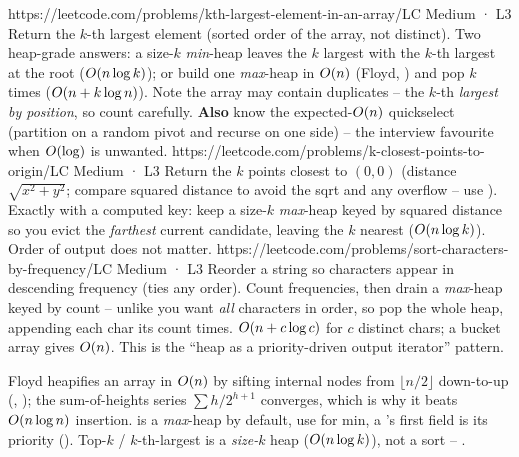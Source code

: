 \begin{practiceset}
    {https://leetcode.com/problems/kth-largest-element-in-an-array/}{LC Medium · L3}
    {Return the $k$-th largest element (sorted order of the array, not distinct). Two heap-grade answers:
    a size-$k$ \emph{min}-heap leaves the $k$ largest with the $k$-th largest at the root ($O(n\log k)$);
    or build one \emph{max}-heap in $O(n)$ (Floyd, ) and pop $k$ times
    ($O(n + k\log n)$). Note the array may contain duplicates -- the $k$-th \emph{largest by position},
    so count carefully. \textbf{Also} know the expected-$O(n)$ quickselect (partition on a random pivot
    and recurse on one side) -- the interview favourite when $O(\log) $ is unwanted.}
    {https://leetcode.com/problems/k-closest-points-to-origin/}{LC Medium · L3}
    {Return the $k$ points closest to $(0,0)$ (distance $\sqrt{x^2+y^2}$; compare squared distance to avoid
    the sqrt and any overflow -- use ). Exactly  with a computed key: keep
    a size-$k$ \emph{max}-heap keyed by squared distance so you evict the \emph{farthest} current candidate,
    leaving the $k$ nearest ($O(n\log k)$). Order of output does not matter.}
    {https://leetcode.com/problems/sort-characters-by-frequency/}{LC Medium · L3}
    {Reorder a string so characters appear in descending frequency (ties any order). Count frequencies, then
    drain a \emph{max}-heap keyed by count -- unlike  you want \emph{all} characters in
    order, so pop the whole heap, appending each char its count times. $O(n + c\log c)$ for $c$ distinct
    chars; a bucket array gives $O(n)$. This is the ``heap as a priority-driven output iterator''
    pattern.}
\end{practiceset}

\begin{recallbox}
Floyd heapifies an array in $O(n)$ by sifting internal nodes from $\lfloor n/2\rfloor$ down-to-up
(, ); the sum-of-heights series $\sum h/2^{h+1}$ converges, which is why
it beats $O(n\log n)$ insertion.  is a \emph{max}-heap by default, use
 for min, a 's first field is its priority (). Top-$k$ /
$k$-th-largest is a \emph{size-$k$} heap ($O(n\log k)$), not a sort -- .
\end{recallbox}
